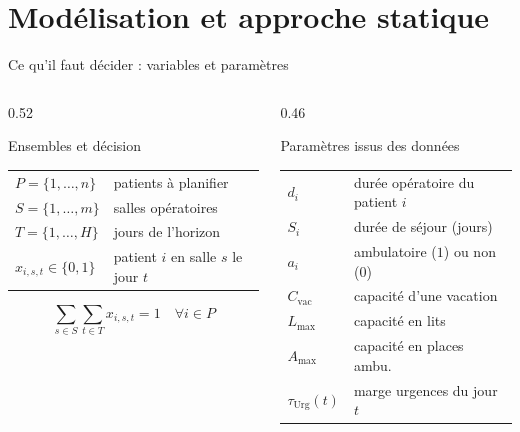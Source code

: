 \section{Modélisation et approche statique}

\begin{frame}{Ce qu'il faut décider : variables et paramètres}
  \small
  \begin{columns}[T,onlytextwidth]
    \begin{column}{0.52\textwidth}
      \begin{block}{Ensembles et décision}
        \begin{tabular}{@{}ll@{}}
          $P = \{1,\dots,n\}$ & patients à planifier \\
          $S = \{1,\dots,m\}$ & salles opératoires \\
          $T = \{1,\dots,H\}$ & jours de l'horizon \\
          $x_{i,s,t} \in \{0,1\}$ & patient $i$ en salle $s$ le jour $t$ \\
        \end{tabular}
        \vspace{4pt}
        \[
          \sum_{s \in S}\sum_{t \in T} x_{i,s,t} = 1
          \quad \forall i \in P
        \]
      \end{block}
    \end{column}
    \begin{column}{0.46\textwidth}
      \begin{block}{Paramètres issus des données}
        \begin{tabular}{@{}ll@{}}
          $d_i$ & durée opératoire du patient $i$ \\
          $S_i$ & durée de séjour (jours) \\
          $a_i$ & ambulatoire ($1$) ou non ($0$) \\
          $C_{\text{vac}}$ & capacité d'une vacation \\
          $L_{\max}$ & capacité en lits \\
          $A_{\max}$ & capacité en places ambu. \\
          $\tau_{\text{Urg}}(t)$ & marge urgences du jour $t$ \\
        \end{tabular}
      \end{block}
    \end{column}
  \end{columns}
\end{frame}


